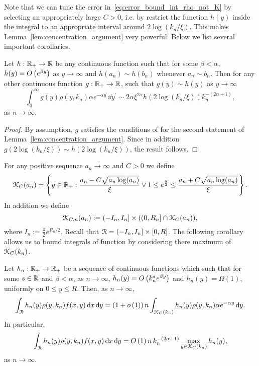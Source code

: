 Note that we can tune the error in~\eqref{eq:error_bound_int_rho_not_K} by selecting an appropriately large $C > 0$, i.e. by restrict the function $h(y)$ inside the integral to an appropriate interval around $2\log(k_n/\xi)$. This makes Lemma~\ref{lem:concentration_argument} very powerful. Below we list several important corollaries. 

\begin{corollary}\label{cor:concentration_of_heights_asymptotics}
Let $h : {\mathbb R}_+ \to {\ensuremath{\mathbb R}}$ be any continuous function such that for some $\beta < \alpha$, $h(y) = O\left(e^{\beta y}\right)$ as $y \to \infty$ and $h(a_n) \sim h(b_n)$ whenever $a_n \sim b_n$. Then for any other continuous function $g: {\mathbb R}_+ \to {\ensuremath{\mathbb R}}$, such that $g(y) \sim h(y)$ as $y \to \infty$
\begin{equation}\label{eq:concentration_h_sim_rho}
	\int_0^\infty g(y) \rho(y,k_n) \alpha e^{-\alpha y^\prime} \dd y^\prime \sim  
		2\alpha \xi^{2\alpha} h(2\log(k_n/\xi)) k_n^{-(2\alpha + 1)},
\end{equation}
as $n \to \infty$.
\end{corollary}

\begin{proof}
By assumption, $g$ satisfies the conditions of for the second statement of Lemma~\ref{lem:concentration_argument}. Since in addition $g(2\log(k_n/\xi)) \sim h(2\log(k_n/\xi))$, the result follows.
\end{proof}


For any positive sequence $a_n \to \infty$ and $C > 0$ we define
\begin{equation}\label{eq:def_K_C_set}
	{\mathcal K}_C(a_n) = \left\{y \in {\ensuremath{\mathbb R}}_+ : \frac{a_n - C \sqrt{a_n \log(a_n)}}{\xi} \vee 1 \le e^{\frac{y}{2}}
	\le \frac{a_n + C \sqrt{a_n \log(a_n)}}{\xi} \right\}.
\end{equation}
In addition we define
\begin{equation}\label{eq:def_K_C_n_set}
	{\mathcal K}_{C,n}(a_n) := (-I_n, I_n] \times ((0,R_n] \cap {\mathcal K}_{C}(a_n)),
\end{equation}
where $I_n := \frac{\pi}{2}e^{R_n/2}$. Recall that ${\mathcal R} = (-I_n, I_n] \times [0,R]$. The following corollary allows us to bound integrals of function by considering there maximum of ${\mathcal K}_{C}(k_n)$.

\begin{corollary}\label{cor:concentration_heights_bounds_n}
Let $h_n : {\mathbb R}_+ \to {\ensuremath{\mathbb R}}_+$ be a sequence of continuous functions which such that for some $s \in {\ensuremath{\mathbb R}}$ and $\beta < \alpha$, as $n \to \infty$, $h_n(y) = O\left(k_n^{s} e^{\beta y}\right)$ and $h_n(y) = \Omega(1)$, uniformly on $0 \le y \le R$. Then, as $n \to \infty$,
\[
	\int_{{\mathcal R}} h_n(y) \rho(y,k_n) f(x,y) \operatorname{\mathrm{d}\hspace{-2pt}} x \operatorname{\mathrm{d}\hspace{-2pt}} y 
	= (1 + o\left(1\right)) \, n \int_{{\mathcal K}_{C}(k_n)} h_n(y) \rho(y,k_n) \alpha e^{-\alpha y} \operatorname{\mathrm{d}\hspace{-2pt}} y.
\]
In particular,
\[
	\int_{{\mathcal R}} h_n(y) \rho(y,k_n) f(x,y) \operatorname{\mathrm{d}\hspace{-2pt}} x \operatorname{\mathrm{d}\hspace{-2pt}} y = O\left(1\right) n \, k_n^{-(2\alpha + 1)} \max_{y \in {\mathcal K}_{C}(k_n)} h_n(y),
\]
as $n \to \infty$.
\end{corollary}

